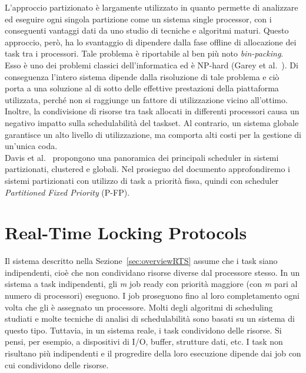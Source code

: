 L'approccio partizionato è largamente utilizzato in quanto permette di analizzare ed eseguire ogni singola partizione come un sistema single processor, con i conseguenti vantaggi dati da uno studio di tecniche e algoritmi maturi. Questo approccio, però, ha lo svantaggio di dipendere dalla fase offline di allocazione dei task tra i processori. Tale problema è riportabile al ben più noto \textit{bin-packing}. Esso è uno dei problemi classici dell'informatica ed è NP-hard (Garey et al.~\cite{Garey:1979:CIG:578533}). Di conseguenza l'intero sistema dipende dalla risoluzione di tale problema e ciò porta a una soluzione al di sotto delle effettive prestazioni della piattaforma utilizzata, perché non si raggiunge un fattore di utilizzazione vicino all'ottimo. Inoltre, la condivisione di risorse tra task allocati in differenti processori causa un negativo impatto sulla schedulabilità del taskset. Al contrario, un sistema globale garantisce un alto livello di utilizzazione, ma comporta alti costi per la gestione di un'unica coda.\\

Davis et al.~\cite{Davis:2011:SHR:1978802.1978814} propongono una panoramica dei principali scheduler in sistemi partizionati, clustered e globali. Nel prosieguo del documento approfondiremo i sistemi partizionati con utilizzo di task a priorità fissa, quindi con scheduler \textit{Partitioned Fixed Priority} (P-FP).

\section{Real-Time Locking Protocols}
\label{sec:lockProtocols}

Il sistema descritto nella Sezione~\ref{sec:overviewRTS} assume che i task siano indipendenti, cioè che non condividano risorse diverse dal processore stesso. In un sistema a task indipendenti, gli \textit{m} job ready con priorità maggiore (con \textit{m} pari al numero di processori) eseguono. I job proseguono fino al loro completamento ogni volta che gli è assegnato un processore. Molti degli algoritmi di scheduling studiati e molte tecniche di analisi di schedulabilità sono basati su un sistema di questo tipo. Tuttavia, in un sistema reale, i task condividono delle risorse. Si pensi, per esempio, a dispositivi di I/O, buffer, strutture dati, etc. I task non risultano più indipendenti e il progredire della loro esecuzione dipende dai job con cui condividono delle risorse.\\

